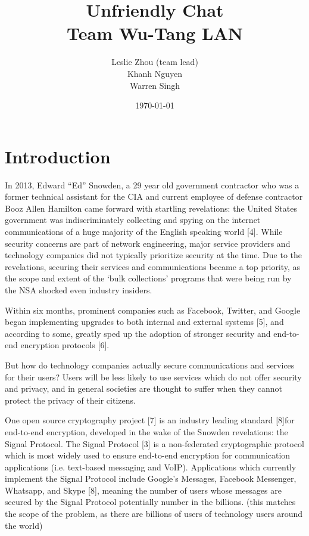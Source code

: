 \documentclass[12pt]{article}
\title{%
    Unfriendly Chat\\
    \large Team Wu-Tang LAN}
\author{Leslie Zhou (team lead)\\ Khanh Nguyen \\ Warren Singh}
\date{\today}
\begin{document}
\maketitle

\newpage
\tableofcontents
\newpage

\section{Introduction}
In 2013, Edward “Ed” Snowden, a 29 year old government contractor who was a former technical assistant for the CIA and current employee of defense contractor Booz Allen Hamilton came forward with startling revelations: the United States government was indiscriminately collecting and spying on the internet communications of a huge majority of the English speaking world [4]. While security concerns are part of network engineering, major service providers and technology companies did not typically prioritize security at the time. Due to the revelations, securing their services and communications became a top priority, as the scope and extent of the ‘bulk collections’ programs that were being run by the NSA shocked even industry insiders.
\par Within six months, prominent companies such as Facebook, Twitter, and Google began implementing upgrades to both internal and external systems [5], and according to some, greatly sped up the adoption of stronger security and end-to-end encryption protocols [6]. 

\par %
But how do technology companies actually secure communications and services for their users? Users will be less likely to use services which do not offer security and privacy, and in general societies are thought to suffer when they cannot protect the privacy of their citizens. 
\par One open source cryptography project [7] is an industry leading standard [8]for end-to-end encryption, developed in the wake of the Snowden revelations: the Signal Protocol. The Signal Protocol [3] is a non-federated cryptographic protocol which is most widely used to ensure end-to-end encryption for communication applications (i.e. text-based messaging and VoIP). Applications which currently implement the Signal Protocol include Google’s Messages, Facebook Messenger, Whatsapp, and Skype [8], meaning the number of users whose messages are secured by the Signal Protocol potentially number in the billions. (this matches the scope of the problem, as there are billions of users of technology users around the world)
\end{document}
